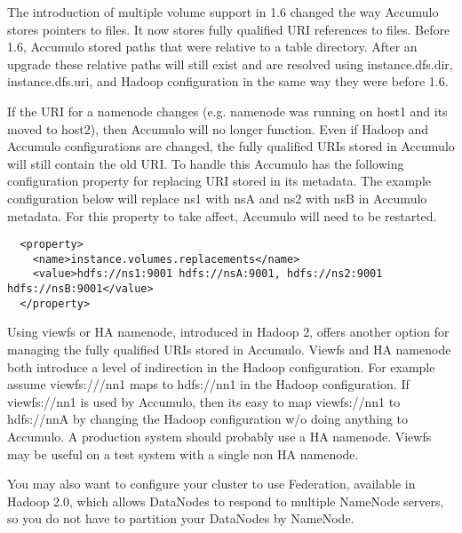 The introduction of multiple volume support in 1.6 changed the way Accumulo
stores pointers to files.  It now stores fully qualified URI references to
files.  Before 1.6, Accumulo stored paths that were relative to a table
directory.   After an upgrade these relative paths will still exist and are
resolved using instance.dfs.dir, instance.dfs.uri, and Hadoop configuration in
the same way they were before 1.6. 

If the URI for a namenode changes (e.g. namenode was running on host1 and its
moved to host2), then Accumulo will no longer function.  Even if Hadoop and
Accumulo configurations are changed, the fully qualified URIs stored in
Accumulo will still contain the old URI.  To handle this Accumulo has the
following configuration property for replacing URI stored in its metadata.  The
example configuration below will replace ns1 with nsA and ns2 with nsB in
Accumulo metadata.  For this property to take affect, Accumulo will need to be
restarted.

\small
\begin{verbatim}
  <property>
    <name>instance.volumes.replacements</name>
    <value>hdfs://ns1:9001 hdfs://nsA:9001, hdfs://ns2:9001 hdfs://nsB:9001</value>
  </property>
\end{verbatim}
\normalsize

Using viewfs or HA namenode, introduced in Hadoop 2, offers another option for
managing the fully qualified URIs stored in Accumulo.  Viewfs and HA namenode
both introduce a level of indirection in the Hadoop configuration.   For
example assume viewfs:///nn1 maps to hdfs://nn1 in the Hadoop configuration.
If viewfs://nn1 is used by Accumulo, then its easy to map viewfs://nn1 to
hdfs://nnA by changing the Hadoop configuration w/o doing anything to Accumulo.
A production system should probably use a HA namenode.  Viewfs may be useful on
a test system with a single non HA namenode.

You may also want to configure your cluster to use Federation,
available in Hadoop 2.0, which allows DataNodes to respond to multiple
NameNode servers, so you do not have to partition your DataNodes by
NameNode.
